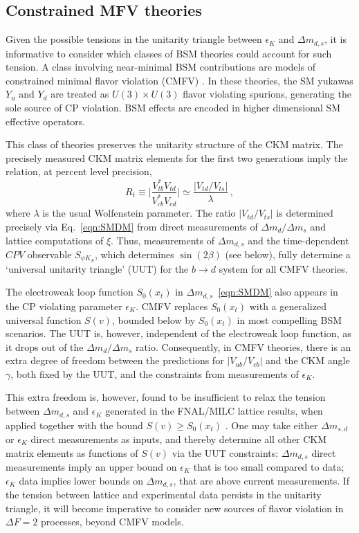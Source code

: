 \subsection{Constrained MFV theories}
Given the possible tensions in the unitarity triangle between $\epsilon_K$ and $\Delta m_{d,s}$, it is informative to consider which classes of BSM theories could account for such tension. A class involving near-minimal BSM contributions are models of constrained minimal flavor violation (CMFV) \cite{Buras:2000dm,Buras:2003jf,Blanke:2006ig,Blanke:2006yh,Blanke:2016bhf}. In these theories, the SM yukawas $Y_u$ and $Y_d$ are treated as $U(3)\times U(3)$ flavor violating spurions, generating the sole source of CP violation.  BSM effects are encoded in higher dimensional SM effective operators.

This class of theories preserves the unitarity structure of the CKM matrix. The precisely measured CKM matrix elements for the first two generations imply the relation, at percent level precision,
\begin{equation}
	R_t \equiv \bigg|\frac{V_{tb}^*V_{td}}{V_{cb}^*V_{cd}}\bigg| \simeq \frac{|V_{td}/V_{ts}|}{\lambda}\,,
\end{equation}
where $\lambda$ is the usual Wolfenstein parameter. The ratio $|V_{td}/V_{ts}|$ is determined precisely via Eq.~\eqref{eqn:SMDM} from direct measurements of $\Delta m_d/ \Delta m_s$ and lattice computations of $\xi$. Thus, measurements of $\Delta m_{d,s}$ and the time-dependent $CPV$ observable $S_{\psi K_S}$, which determines $\sin(2\beta)$ (see below), fully determine a `universal unitarity triangle' (UUT) for the $b \to d$ system for all CMFV theories. 

The electroweak loop function $S_0(x_t)$ in $\Delta m_{d,s}$~\eqref{eqn:SMDM} also appears in the CP violating parameter $\epsilon_K$. CMFV replaces $S_0(x_t)$ with a generalized universal function $S(v)$, bounded below by $S_0(x_t)$ in most compelling BSM scenarios. The UUT is, however, independent of the electroweak loop function, as it drops out of the $\Delta m_{d}/\Delta m_s$ ratio. Consequently, in CMFV theories, there is an extra degree of freedom between the predictions for $|V_{ub}/V_{cb}|$ and the CKM angle $\gamma$, both fixed by the UUT, and the constraints from measurements of $\epsilon_K$. 

This extra freedom is, however, found to be insufficient to relax the tension between $\Delta m_{d,s}$ and $\epsilon_K$ generated in the FNAL/MILC lattice results, when applied together with the bound $S(v) \ge S_0(x_t)$ \cite{Blanke:2016bhf, Blanke:2016xvd}. One may take either $\Delta m_{s,d}$ or $\epsilon_K$ direct measurements as inputs, and thereby determine all other CKM matrix elements as functions of $S(v)$ via the UUT constraints: $\Delta m_{d,s}$ direct measurements imply an upper bound on $\epsilon_K$ that is too small compared to data; $\epsilon_K$ data implies lower bounds on $\Delta m_{d,s}$, that are above current measurements. If the tension between lattice and experimental data persists in the unitarity triangle, it will become imperative to consider new sources of flavor violation in $\Delta F = 2$ processes, beyond CMFV models.

